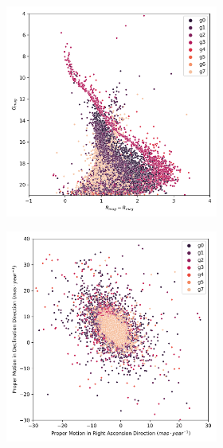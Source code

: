 \documentclass[11pt, a4paper, english]{book}
\begin{document}
\begin{figure}[H]
\begin{subfigure}{0.9\textwidth}
\begin{subfigure}[t]{0.30\textwidth}
    \end{subfigure}
    \hfill
    \begin{subfigure}[t]{0.30\textwidth}
      \centering
      \includegraphics[width=\textwidth]{../figures/ngc_2516/dec_hr_diagram_ngc_2516.png}
    \end{subfigure}
  \end{subfigure}
  \caption{NGC 2516 DEC characterization. Identified as cluster \emph{g3}.}
  \label{fig:result_ngc_2516_dec}
  \centering
  \begin{subfigure}{0.9\textwidth}
    \centering
    \begin{subfigure}[t]{0.30\textwidth}
      \centering
      \includegraphics[width=\textwidth]{../figures/ngc_2516/dec_pm_filtered_ngc_2516.png}

\end{subfigure}
\end{subfigure}
\end{figure}
\end{document}

